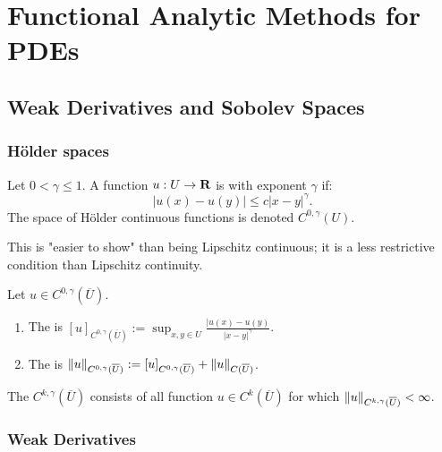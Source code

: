 \chapter{Functional Analytic Methods for PDEs}

\section{Weak Derivatives and Sobolev Spaces}

\subsection{H\"older spaces}

\begin{definition}
	Let $0 < \gamma \leq 1$. A function $u:U \rightarrow \mathbf{R}$ is  with exponent $\gamma$ if:
	\[
		|u(x) - u(y)| \leq c|x-y|^{\gamma}.
	\]
	The space of H\"older continuous functions is denoted $C^{0,\gamma}(U)$.
\end{definition}

\begin{remark}
	This is "easier to show" than being Lipschitz continuous; it is a less restrictive condition than Lipschitz continuity.
\end{remark}

\begin{definition}
	Let $u \in C^{0,\gamma}(\overline{U})$.
	\mbox{}
	\begin{enumerate}[label = (\alph*),itemsep=1pt,topsep=3pt]
		\item The  is $[u]_{C^{0,\gamma}(\overline{U})} := \sup_{x,y \in U} \frac{|u(x) -u(y)}{|x-y|^\gamma}$.
		\item The  is $\left\lVert u \right\rVert_{C^{0,\gamma}(\overline{U})}:=[u]_{C^{0,\gamma}(\overline{U})} + \left\lVert u \right\rVert_{C(\overline{U})}$.
	\end{enumerate}
\end{definition}

\begin{definition}
	The  $C^{k,\gamma}(\overline{U})$ consists of all function $u \in C^k(\overline{U})$ for which $\left\lVert u \right\rVert_{C^{k,\gamma}(\overline{U})} < \infty$.
\end{definition}

\subsection{Weak Derivatives}


